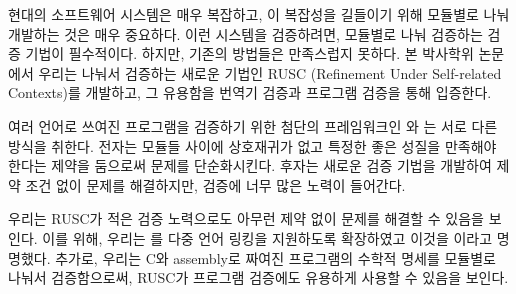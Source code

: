 
\begin{abstractalt}
현대의 소프트웨어 시스템은 매우 복잡하고, 이 복잡성을 길들이기 위해 모듈별로 나눠 개발하는 것은 매우 중요하다.
이런 시스템을 검증하려면, 모듈별로 나눠 검증하는 검증 기법이 필수적이다.
하지만, 기존의 방법들은 만족스럽지 못하다.
본 박사학위 논문에서 우리는 나눠서 검증하는 새로운 기법인 RUSC (Refinement
Under Self-related Contexts)를 개발하고, 그 유용함을 번역기 검증과 프로그램 검증을 통해 입증한다.

여러 언어로 쓰여진 프로그램을 검증하기 위한 첨단의 프레임워크인 \ccx{}와 \ccc{}는 서로 다른 방식을 취한다.
전자는 모듈들 사이에 상호재귀가 없고 특정한 좋은 성질을 만족해야 한다는 제약을 둠으로써 문제를 단순화시킨다.
후자는 새로운 검증 기법을 개발하여 제약 조건 없이 문제를 해결하지만, 검증에 너무 많은 노력이 들어간다.

우리는 RUSC가 적은 검증 노력으로도 아무런 제약 없이 문제를 해결할 수 있음을 보인다.
이를 위해, 우리는 \cc{}를 다중 언어 링킹을 지원하도록 확장하였고 이것을 \ccm{}이라고 명명했다.
추가로, 우리는 C와 assembly로 짜여진 프로그램의 수학적 명세를 모듈별로 나눠서 검증함으로써, RUSC가 프로그램 검증에도 유용하게 사용할 수 있음을 보인다.

\end{abstractalt}
